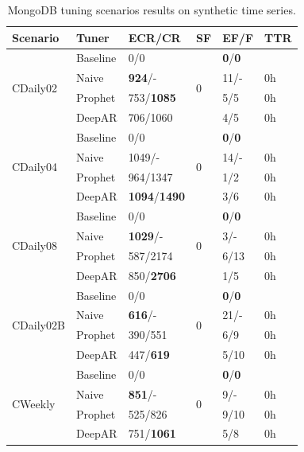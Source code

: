 \documentclass[a4paper, 12pt]{article} %
\newcommand{\ra}[1]{\renewcommand{\arraystretch}{#1}}
\begin{document}
	\begin{table}\centering 
		\ra{1.3}
		\begin{tabularx}{\textwidth}{@{}XXXXXX@{}}
			\toprule
			Scenario & Tuner & ECR/CR & SF & EF/F & TTR\\
			
			\midrule
			\multirow{4}{*}{CDaily02}
			& Baseline & 0/0 & \multirow{4}{*}{0}  & \textbf{0}/\textbf{0} & \\
			& Naive & \textbf{924}/- && 11/- & 0h \\
			& Prophet & 753/\textbf{1085} && 5/5 & 0h \\
			& DeepAR & 706/1060 && 4/5 & 0h \\
			
			
			\midrule
			\multirow{4}{*}{CDaily04}
			& Baseline & 0/0 & \multirow{4}{*}{0}  & \textbf{0}/\textbf{0} & \\
			& Naive & 1049/- && 14/- & 0h \\
			& Prophet & 964/1347 && 1/2 & 0h\\
			& DeepAR & \textbf{1094}/\textbf{1490} && 3/6 & 0h \\
			
			\midrule
			\multirow{4}{*}{CDaily08}
			& Baseline & 0/0 & \multirow{4}{*}{0}  & \textbf{0}/\textbf{0} & \\
			& Naive & \textbf{1029}/- && 3/- & 0h \\
			& Prophet & 587/2174 && 6/13 & 0h \\
			& DeepAR & 850/\textbf{2706} && 1/5 & 0h \\
			
			\midrule
			\multirow{4}{*}{CDaily02B}
			& Baseline & 0/0 & \multirow{4}{*}{0}  & \textbf{0}/\textbf{0} & \\
			& Naive & \textbf{616}/- && 21/- & 0h \\
			& Prophet & 390/551 && 6/9 & 0h \\
			& DeepAR & 447/\textbf{619} &&5/10 & 0h \\
			
			\midrule
			\multirow{4}{*}{CWeekly}
			& Baseline & 0/0 & \multirow{4}{*}{0}  & \textbf{0}/\textbf{0} & \\
			& Naive & \textbf{851}/- && 9/- & 0h \\
			& Prophet & 525/826 && 9/10 & 0h \\
			& DeepAR & 751/\textbf{1061} && 5/8 & 0h \\
			
			\bottomrule
		\end{tabularx}
		\caption{MongoDB tuning scenarios results on synthetic time series. } \label{table:results_cassandra_synthetic}
	\end{table}
	
\end{document}
